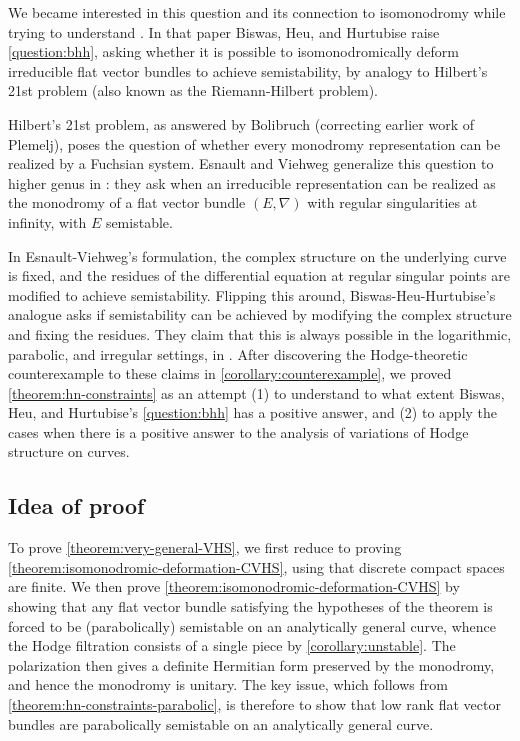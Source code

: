 We became interested in this question and its connection to isomonodromy while
trying to understand \cite{BHH:logarithmic}. In that paper Biswas, Heu, and
Hurtubise raise \autoref{question:bhh}, asking whether it is possible to isomonodromically deform irreducible flat vector bundles to achieve semistability, by analogy to Hilbert's 21st problem (also known as the Riemann-Hilbert problem).

Hilbert's 21st problem, as answered by  Bolibruch \cite{bolibruch1995riemann} (correcting earlier work of Plemelj), poses the question of whether every monodromy representation can be realized by a Fuchsian system. Esnault and Viehweg generalize this question to higher genus in \cite{esnault1999semistable}: they ask when an irreducible representation can be realized as the monodromy of a flat vector bundle $(E, \nabla)$ with regular singularities at infinity, with $E$ semistable.

 In Esnault-Viehweg's formulation, the complex structure on the underlying curve
 is fixed, and the residues of the differential equation at regular singular
 points are modified to achieve semistability. Flipping this around,
 Biswas-Heu-Hurtubise's analogue asks if semistability can be achieved by
 modifying the complex structure and fixing the residues. They claim that this
 is always possible in the logarithmic, parabolic, and irregular settings, in
 \cite{BHH:logarithmic,BHH:parabolic,BHH:irregular}. After discovering the
 Hodge-theoretic counterexample to these claims in
 \autoref{corollary:counterexample}, we proved \autoref{theorem:hn-constraints}
 as an attempt  (1) to understand to what extent Biswas, Heu, and Hurtubise's
 \autoref{question:bhh} has a positive answer, and (2) to apply the cases when there is a positive answer to the analysis of variations of Hodge structure on curves.

\subsection{Idea of proof}
\label{subsection:idea-of-proof}

To prove \autoref{theorem:very-general-VHS}, we first reduce to proving
\autoref{theorem:isomonodromic-deformation-CVHS}, using that discrete compact
spaces are finite.
We then prove \autoref{theorem:isomonodromic-deformation-CVHS} by showing that
any flat vector bundle satisfying the hypotheses of the theorem is forced to be (parabolically) semistable on an analytically general curve, whence the Hodge
filtration consists of a single piece by \autoref{corollary:unstable}.
The polarization then gives a definite Hermitian form preserved by the monodromy, and hence
the monodromy is unitary.
The key issue, which follows from \autoref{theorem:hn-constraints-parabolic},
is therefore to show that low rank flat vector bundles %
are parabolically semistable
on an analytically general curve.

